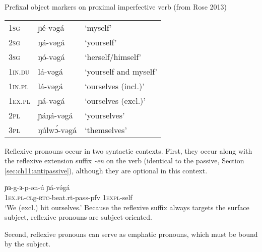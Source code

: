 \ea Prefixal object markers on proximal imperfective verb (from Rose 2013)\\
\begin{tabular}[t]{lll}
1\textsc{sg} & ɲé-vəgá	 & `myself'\\
2\textsc{sg} &  ŋá-vəgá	 & `yourself'\\
3\textsc{sg} &  ŋó-vəgá	 & `herself/himself'\\
1\textsc{in}.\textsc{du} & lá-vəgá	& `yourself and myself'\\
1\textsc{in}.\textsc{pl} & lá-vəgá  & `ourselves (incl.)'\\
1\textsc{ex}.\textsc{pl} & ɲá-vəgá & `ourselves (excl.)'\\
2\textsc{pl} & ɲáŋá-vəgá	 & `yourselves'\\
3\textsc{pl} & ŋúlwɔ́-vəgá & `themselves'\\
\end{tabular}
\z

Reflexive pronouns occur in two syntactic contexts. First, they occur along with the reflexive extension suffix  \textit{-en} on the verb (identical to the passive, Section \ref{sec:ch11:antipassive}), although they are optional in this context.

\ea 	\gll ɲɜ-g-ɜ-p-ən-ú ɲá-və́gá \\
			1\textsc{ex}.\textsc{pl}-\textsc{cl}g-\textsc{rtc}-beat.rt-pass-pfv 1\textsc{expl}-self\\
		\glt	`We (excl.) hit ourselves.'
\z 
Because the reflexive suffix always targets the surface subject, reflexive pronouns are subject-oriented.





Second, reflexive pronouns can serve as emphatic pronouns, which must be bound by the subject.

